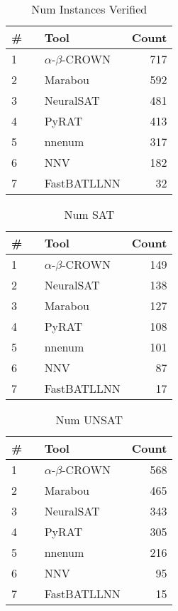 \begin{table}[h]
\begin{center}
\caption{Num Instances Verified} \label{tab:stats1}
{\setlength{\tabcolsep}{2pt}
\begin{tabular}[h]{@{}llr@{}}
\toprule
\textbf{\# ~} & \textbf{Tool} & \textbf{Count}\\
\midrule
1 & $\alpha$-$\beta$-CROWN & 717 \\
2 & Marabou & 592 \\
3 & NeuralSAT & 481 \\
4 & PyRAT & 413 \\
5 & nnenum & 317 \\
6 & NNV & 182 \\
7 & FastBATLLNN & 32 \\
\bottomrule
\end{tabular}
}
\end{center}
\end{table}




\begin{table}[h]
\begin{center}
\caption{Num SAT} \label{tab:stats2}
{\setlength{\tabcolsep}{2pt}
\begin{tabular}[h]{@{}llr@{}}
\toprule
\textbf{\# ~} & \textbf{Tool} & \textbf{Count}\\
\midrule
1 & $\alpha$-$\beta$-CROWN & 149 \\
2 & NeuralSAT & 138 \\
3 & Marabou & 127 \\
4 & PyRAT & 108 \\
5 & nnenum & 101 \\
6 & NNV & 87 \\
7 & FastBATLLNN & 17 \\
\bottomrule
\end{tabular}
}
\end{center}
\end{table}




\begin{table}[h]
\begin{center}
\caption{Num UNSAT} \label{tab:stats3}
{\setlength{\tabcolsep}{2pt}
\begin{tabular}[h]{@{}llr@{}}
\toprule
\textbf{\# ~} & \textbf{Tool} & \textbf{Count}\\
\midrule
1 & $\alpha$-$\beta$-CROWN & 568 \\
2 & Marabou & 465 \\
3 & NeuralSAT & 343 \\
4 & PyRAT & 305 \\
5 & nnenum & 216 \\
6 & NNV & 95 \\
7 & FastBATLLNN & 15 \\
\bottomrule
\end{tabular}
}
\end{center}
\end{table}



